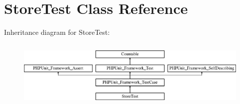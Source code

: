 \section{Store\+Test Class Reference}
\label{class_symfony_1_1_component_1_1_http_kernel_1_1_tests_1_1_http_cache_1_1_store_test}
Inheritance diagram for Store\+Test\+:\begin{figure}[H]
\begin{center}
\leavevmode
\includegraphics[height=3.303835cm]{class_symfony_1_1_component_1_1_http_kernel_1_1_tests_1_1_http_cache_1_1_store_test}
\end{center}
\end{figure}
